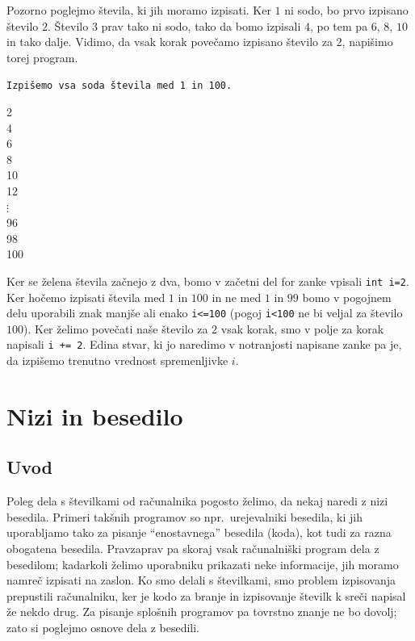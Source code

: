 \documentclass{book}
\begin{document}
Pozorno poglejmo števila, ki jih moramo izpisati. Ker $1$ ni sodo, bo prvo
izpisano število $2$. Število $3$ prav tako ni sodo, tako da bomo izpisali $4$,
po tem pa $6$, $8$, $10$ in tako dalje. Vidimo, da vsak korak povečamo izpisano
število za $2$, napišimo torej program.

\begin{examples}
\verb+Izpišemo vsa soda števila med 1 in 100.+


\begin{inout}
	2  \\
	4  \\
	6  \\
	8  \\
	10 \\
	12 \\
	$\vdots$ \\
	96 \\
	98 \\
	100
\end{inout}

\end{examples}

Ker se želena števila začnejo z dva, bomo v začetni del for zanke vpisali
\texttt{int i=2}. Ker hočemo izpisati števila med $1$ in $100$ in ne med $1$ in
$99$ bomo v pogojnem delu uporabili znak manjše ali enako \texttt{i<=100}
(pogoj \texttt{i<100} ne bi veljal za število $100$). Ker želimo povečati naše
število za $2$ vsak korak, smo v polje za korak napisali \texttt{i += 2}.
Edina stvar, ki jo naredimo v notranjosti napisane zanke pa je, da izpišemo
trenutno vrednost spremenljivke $i$.

\chapter{Nizi in besedilo}

\section{Uvod}

Poleg dela s številkami od računalnika pogosto želimo, da nekaj naredi z nizi
besedila.
Primeri takšnih programov so npr.~urejevalniki besedila, ki jih uporabljamo tako
za pisanje ``enostavnega'' besedila (koda), kot tudi za razna obogatena
besedila.
Pravzaprav pa skoraj vsak računalniški program dela z besedilom; kadarkoli
želimo uporabniku prikazati neke informacije, jih moramo namreč izpisati na
zaslon.
Ko smo delali s številkami, smo problem izpisovanja prepustili računalniku, ker
je kodo za branje in izpisovanje številk k sreči napisal že nekdo drug.
Za pisanje splošnih programov pa tovrstno znanje ne bo dovolj; zato si poglejmo
osnove dela z besedili.
\end{document}
